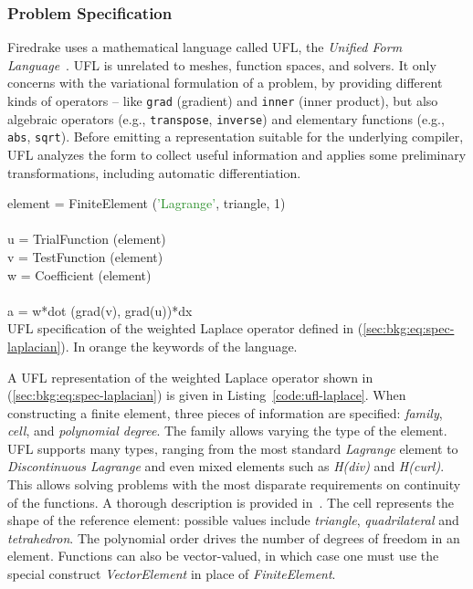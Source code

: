 \subsubsection{Problem Specification}
Firedrake uses a mathematical language called UFL, the {\em Unified Form Language}~\cite{ufl-cite}. UFL is unrelated to meshes, function spaces, and solvers. It only concerns with the variational formulation of a problem, by providing different kinds of operators -- like \texttt{grad} (gradient) and \texttt{inner} (inner product), but also algebraic operators (e.g., \texttt{transpose}, \texttt{inverse}) and elementary functions (e.g., \texttt{abs}, \texttt{sqrt}). Before emitting a representation suitable for the underlying compiler, UFL analyzes the form to collect useful information and applies some preliminary transformations, including automatic differentiation.

\begin{algorithm}[h]
\scriptsize\ttfamily
{}

element = \textcolor{RedOrange}{FiniteElement} (\textcolor{ForestGreen}{'Lagrange'}, \textcolor{RedOrange}{triangle}, 1)\\
~\\
u = \textcolor{RedOrange}{TrialFunction} (element)\\
v = \textcolor{RedOrange}{TestFunction} (element)\\
w = \textcolor{RedOrange}{Coefficient} (element)\\
~\\
a = w*\textcolor{RedOrange}{dot} (\textcolor{RedOrange}{grad}(v), \textcolor{RedOrange}{grad}(u))*\textcolor{RedOrange}{dx}\\

\caption{UFL specification of the weighted Laplace operator defined in (\ref{sec:bkg:eq:spec-laplacian}). In orange the keywords of the language. }
\label{code:ufl-laplace}
\end{algorithm}

A UFL representation of the weighted Laplace operator shown in (\ref{sec:bkg:eq:spec-laplacian}) is given in Listing~\ref{code:ufl-laplace}. When constructing a finite element, three pieces of information are specified: {\em family}, {\em cell}, and {\em polynomial degree}. The family allows varying the type of the element. UFL supports many types, ranging from the most standard {\em Lagrange} element to {\em Discontinuous Lagrange} and even mixed elements such as {\em H(div)} and {\em H(curl)}. This allows solving problems with the most disparate requirements on continuity of the functions. A thorough description is provided in~\cite{Fenics}. The cell represents the shape of the reference element: possible values include {\em triangle}, {\em quadrilateral} and {\em tetrahedron}. The polynomial order drives the number of degrees of freedom in an element. Functions can also be vector-valued, in which case one must use the special construct {\em VectorElement} in place of {\em FiniteElement}. 

